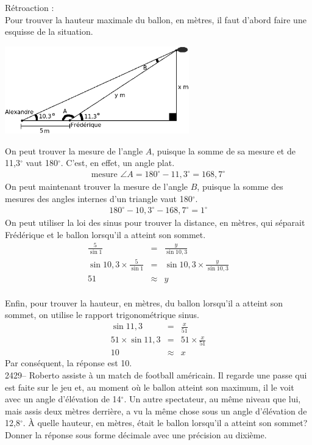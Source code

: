 \documentclass[letterpaper, 12pt]{article}
\begin{document}
R\'etroaction :\\
Pour trouver la hauteur maximale du ballon, en m\`etres, il faut d'abord faire une esquisse de la situation.
\begin{center}
 \includegraphics[width=8cm,bb=0 408 689 842]{Q2411.eps}
\end{center}
On peut trouver la mesure de l'angle $A$, puisque la somme de sa mesure et de 11,3$^{\circ}$ vaut 180$^{\circ}$. C'est, en effet, un angle plat.
\begin{eqnarray*}
\textrm{mesure }\angle{A} = 180^{\circ}-11,3^{\circ} = 168,7 ^{\circ}
\end{eqnarray*}
On peut maintenant trouver la mesure de l'angle $B$, puisque la somme des mesures des angles internes d'un triangle vaut 180$^{\circ}$.
\begin{eqnarray*}
 180^{\circ}-10,3^{\circ}-168,7^{\circ}=1^{\circ}
\end{eqnarray*}
On peut utiliser la loi des sinus pour trouver la distance, en m\`etres,  qui s\'eparait Fr\'ed\'erique et le ballon lorsqu'il a atteint son sommet.
\begin{eqnarray*}
 \frac{5}{\sin{1}}&=& \frac{y}{\sin{10,3}}\\[2mm]
 \sin{10,3} \times \frac{5}{\sin{1}}&=&  \sin{10,3} \times \frac{y}{\sin{10,3}}\\[2mm]
 51&\approx&  y
\end{eqnarray*}\\
Enfin, pour trouver la hauteur, en m\`etres, du ballon lorsqu'il a atteint son sommet, on utilise le rapport trigonom\'etrique sinus.
\begin{eqnarray*}
 \sin{11,3} &=& \frac{x}{51}\\[2mm]
51 \times \sin{11,3} &=& 51 \times\frac{x}{51}\\[2mm]
10 &\approx& x
\end{eqnarray*}
Par cons\'equent, la r\'eponse est 10.\\

2429--  Roberto assiste \`a un match de football am\'ericain. Il regarde une passe qui est faite sur le jeu et, au moment o\`u le ballon atteint son maximum, il le voit avec un angle d'\'el\'evation de 14$^{\circ}$. Un autre spectateur, au m\^eme niveau que lui, mais assis deux m\`etres derri\`ere, a vu la m\^eme chose sous un angle d'\'el\'evation de 12,8$^{\circ}$. \`A quelle hauteur, en m\`etres, \'etait le ballon lorsqu'il a atteint son sommet?\\
Donner la r\'eponse sous forme d\'ecimale avec une pr\'ecision au dixi\`eme.\\
\end{document}

